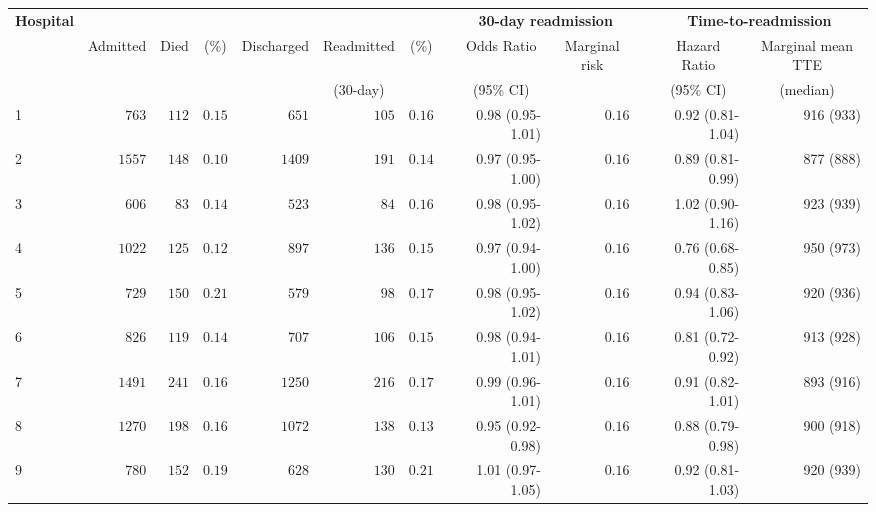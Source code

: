 \documentclass[]{article}\usepackage[]{graphicx}\usepackage[]{color}
\begin{document}

\begin{landscape}

\setmainfont[Scale=1]{Cambria}
\linespread{1}

\begin{table}[!tbp]
\begin{center}
\begin{tabular}{lrrrrrrcrrcrr}
\hline\hline
\multicolumn{1}{l}{\bfseries Hospital}&\multicolumn{6}{c}{\bfseries }&\multicolumn{1}{c}{\bfseries }&\multicolumn{2}{c}{\bfseries 30-day readmission}&\multicolumn{1}{c}{\bfseries }&\multicolumn{2}{c}{\bfseries Time-to-readmission}\tabularnewline
\cline{9-10} \cline{12-13}
\multicolumn{1}{l}{}&\multicolumn{1}{c}{Admitted}&\multicolumn{1}{c}{Died}&\multicolumn{1}{c}{(\%)}&\multicolumn{1}{c}{Discharged}&\multicolumn{1}{c}{Readmitted}&\multicolumn{1}{c}{(\%)}&\multicolumn{1}{c}{}&\multicolumn{1}{c}{Odds Ratio}&\multicolumn{1}{c}{Marginal risk}&\multicolumn{1}{c}{}&\multicolumn{1}{c}{Hazard Ratio}&\multicolumn{1}{c}{Marginal mean TTE}\tabularnewline
&&&&&\multicolumn{1}{c}{{\scriptsize (30-day)}}&&&\multicolumn{1}{c}{{\scriptsize (95\% CI)}}&&&\multicolumn{1}{c}{{\scriptsize (95\% CI)}}&\multicolumn{1}{c}{{\scriptsize (median)}}\tabularnewline
\hline
1&$ 763$&$112$&$0.15$&$ 651$&$105$&$0.16$&&0.98 (0.95-1.01)&$0.16$&&0.92 (0.81-1.04)&916 (933)\tabularnewline
2&$1557$&$148$&$0.10$&$1409$&$191$&$0.14$&&0.97 (0.95-1.00)&$0.16$&&0.89 (0.81-0.99)&877 (888)\tabularnewline
3&$ 606$&$ 83$&$0.14$&$ 523$&$ 84$&$0.16$&&0.98 (0.95-1.02)&$0.16$&&1.02 (0.90-1.16)&923 (939)\tabularnewline
4&$1022$&$125$&$0.12$&$ 897$&$136$&$0.15$&&0.97 (0.94-1.00)&$0.16$&&0.76 (0.68-0.85)&950 (973)\tabularnewline
5&$ 729$&$150$&$0.21$&$ 579$&$ 98$&$0.17$&&0.98 (0.95-1.02)&$0.16$&&0.94 (0.83-1.06)&920 (936)\tabularnewline
6&$ 826$&$119$&$0.14$&$ 707$&$106$&$0.15$&&0.98 (0.94-1.01)&$0.16$&&0.81 (0.72-0.92)&913 (928)\tabularnewline
7&$1491$&$241$&$0.16$&$1250$&$216$&$0.17$&&0.99 (0.96-1.01)&$0.16$&&0.91 (0.82-1.01)&893 (916)\tabularnewline
8&$1270$&$198$&$0.16$&$1072$&$138$&$0.13$&&0.95 (0.92-0.98)&$0.16$&&0.88 (0.79-0.98)&900 (918)\tabularnewline
9&$ 780$&$152$&$0.19$&$ 628$&$130$&$0.21$&&1.01 (0.97-1.05)&$0.16$&&0.92 (0.81-1.03)&920 (939)\tabularnewline

\end{tabular}
\end{center}
\end{table}
\end{landscape}
\end{document}
